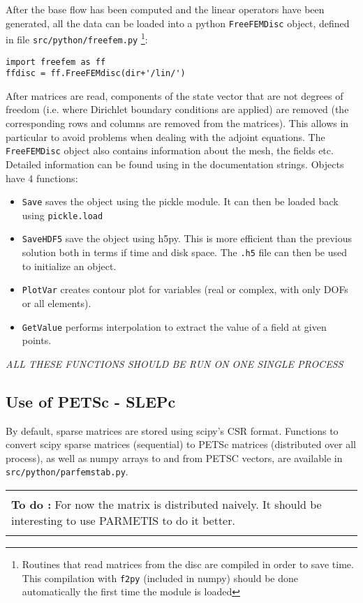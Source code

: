 \documentclass[12pts]{article}%
\newenvironment{TODO}{\vspace{.25cm}\begin{center}\begin{tabular}{|p{.75\linewidth}|} \hline\\ \textbf{To do :}}
{ \\ \\\hline \end{tabular}\end{center}\vspace{.25cm}}
\begin{document}
After the base flow has been computed and the linear operators have
been generated, all the data can be loaded into a python
\texttt{FreeFEMDisc} object, defined in file
\texttt{src/python/freefem.py} \footnote{Routines that read matrices
  from the disc are compiled in order to save time. This compilation
  with \texttt{f2py} (included in numpy) should be done automatically
  the first time the module is loaded}:
\begin{verbatim}
import freefem as ff
ffdisc = ff.FreeFEMdisc(dir+'/lin/')
\end{verbatim}
After matrices are read, components of the state vector that are not
degrees of freedom (i.e. where Dirichlet boundary conditions are
applied) are removed (the corresponding rows and columns are removed
from the matrices). This allows in particular to avoid problems when
dealing with the adjoint equations. The \texttt{FreeFEMDisc} object
also contains information about the mesh, the fields etc. Detailed
information can be found using in the documentation strings. Objects
have 4 functions:
\begin{itemize}
\item \texttt{Save} saves the object using the pickle module. It can
  then be loaded back using \texttt{pickle.load}
\item \texttt{SaveHDF5} save the object using h5py. This is more
  efficient than the previous solution both in terms if time and disk
  space. The \texttt{.h5} file can then be used to initialize an
  object.
\item \texttt{PlotVar} creates contour plot for variables (real or
  complex, with only DOFs or all elements).
\item \texttt{GetValue} performs interpolation to extract the value of
  a field at given points.
\end{itemize}
\emph{ALL THESE FUNCTIONS SHOULD BE RUN ON ONE SINGLE PROCESS}

\subsection{Use of PETSc - SLEPc }

By default, sparse matrices are stored using scipy's CSR
format. Functions to convert scipy sparse matrices (sequential) to
PETSc matrices (distributed over all process), as well as numpy arrays
to and from PETSC vectors, are available in
\texttt{src/python/parfemstab.py}.

\begin{TODO}
For now the matrix is distributed naively. It should be
  interesting to use PARMETIS to do it better.
\end{TODO}
\end{document}
